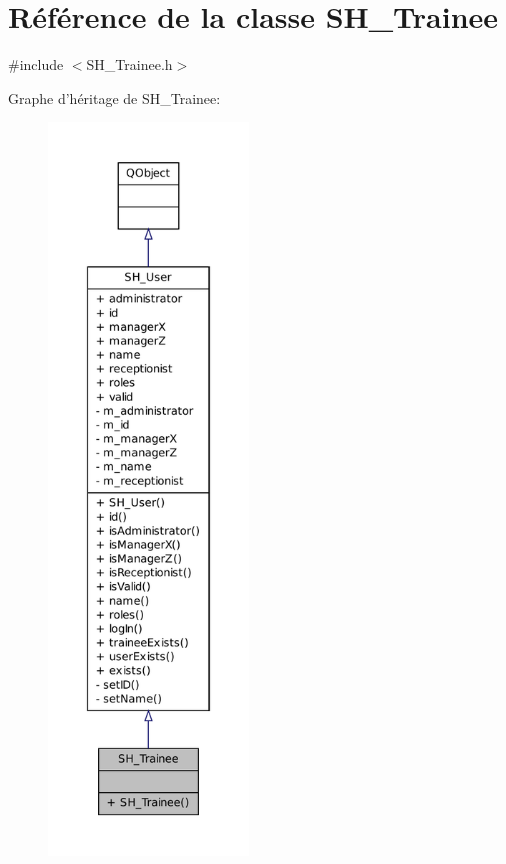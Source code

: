\hypertarget{classSH__Trainee}{\section{Référence de la classe S\-H\-\_\-\-Trainee}
\label{classSH__Trainee}
}


{\ttfamily \#include $<$S\-H\-\_\-\-Trainee.\-h$>$}



Graphe d'héritage de S\-H\-\_\-\-Trainee\-:\nopagebreak
\begin{figure}[H]
\begin{center}
\leavevmode
\includegraphics[height=550pt]{classSH__Trainee__inherit__graph}
\end{center}
\end{figure}


